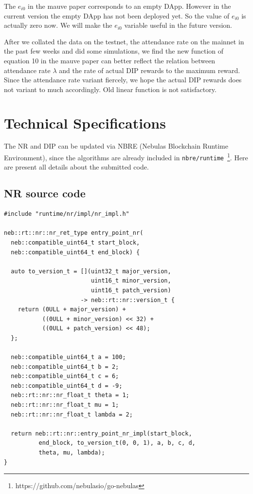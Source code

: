 \documentclass[11pt]{article}
\begin{document}
The $e_{i0}$ in the mauve paper corresponds to an empty DApp. However in the current version the empty DApp has not been deployed yet. So the value of $e_{i0}$ is actually zero now. We will make the $e_{i0}$ variable useful in the future version. 

After we collated the data on the testnet, the attendance rate on the mainnet in the past few weeks and did some simulations, we find the new function of equation 10 in the mauve paper can better reflect the relation between attendance rate $\lambda$ and the rate of actual DIP rewards to the maximum reward. Since the attendance rate variant fiercely, we hope the actual  DIP rewards does not variant to much accordingly. Old linear function is not satisfactory. 

\section{Technical Specifications}

The NR and DIP can be updated via NBRE (Nebulas Blockchain Runtime
Environment), since the algorithms are already included in
\texttt{nbre/runtime}~\footnote{https://github.com/nebulasio/go-nebulas}. Here
are present all details about the submitted code.

\subsection{NR source code}
\begin{lstlisting}
#include "runtime/nr/impl/nr_impl.h"

neb::rt::nr::nr_ret_type entry_point_nr(
  neb::compatible_uint64_t start_block,
  neb::compatible_uint64_t end_block) {

  auto to_version_t = [](uint32_t major_version,
                         uint16_t minor_version,
                         uint16_t patch_version)
                      -> neb::rt::nr::version_t {
    return (0ULL + major_version) +
           ((0ULL + minor_version) << 32) +
           ((0ULL + patch_version) << 48);
  };

  neb::compatible_uint64_t a = 100;
  neb::compatible_uint64_t b = 2;
  neb::compatible_uint64_t c = 6;
  neb::compatible_uint64_t d = -9;
  neb::rt::nr::nr_float_t theta = 1;
  neb::rt::nr::nr_float_t mu = 1;
  neb::rt::nr::nr_float_t lambda = 2;

  return neb::rt::nr::entry_point_nr_impl(start_block,
          end_block, to_version_t(0, 0, 1), a, b, c, d,
          theta, mu, lambda);
}
\end{lstlisting}
\end{document}
